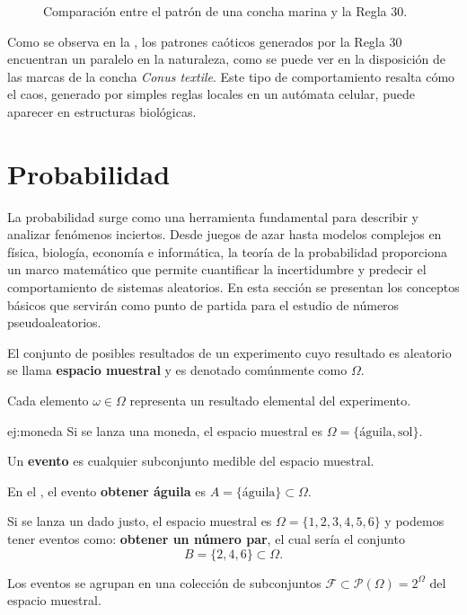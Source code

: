 \documentclass[../Main.tex]{subfiles}
\begin{document}
\begin{figure}[h!]
\hfill
{}
\hfill
{}
\hfill
\caption{Comparación entre el patrón de una concha marina y la Regla 30.}
\label{fig:R30-comp}
\end{figure}

Como se observa en la , los patrones caóticos generados por la Regla 30 encuentran un paralelo en la naturaleza, como se puede ver en la disposición de las marcas de la concha \textit{Conus textile}. Este tipo de comportamiento resalta cómo el caos, generado por simples reglas locales en un autómata celular, puede aparecer en estructuras biológicas.

\section{Probabilidad}
La probabilidad surge como una herramienta fundamental para describir y analizar fenómenos inciertos. Desde juegos de azar hasta modelos complejos en física, biología, economía e informática, la teoría de la probabilidad proporciona un marco matemático que permite cuantificar la incertidumbre y predecir el comportamiento de sistemas aleatorios. En esta sección se presentan los conceptos básicos que servirán como punto de partida para el estudio de números pseudoaleatorios.

\begin{definition}{}{}
El conjunto de posibles resultados de un experimento cuyo resultado es aleatorio se llama \textbf{espacio muestral} y es denotado comúnmente como $\Omega$. 
\end{definition}
Cada elemento $\omega \in \Omega$ representa un resultado elemental del experimento. 
\begin{example}{}{ej:moneda}
    Si se lanza una moneda, el espacio muestral es $\Omega = \{\text{águila}, \text{sol}\}$.
\end{example}
\begin{definition}{}{}
Un \textbf{evento} es cualquier subconjunto medible del espacio muestral.
\end{definition}
En el , el evento \textbf{obtener águila} es $A = \{\text{águila}\}\subset \Omega$. 
\begin{example}{}{}
    Si se lanza un dado justo, el espacio muestral es  $\Omega =\{1,2,3,4,5,6\}$ y podemos tener eventos como: \textbf{obtener un número par}, el cual sería el conjunto $$B=\{2,4,6\}\subset \Omega.$$
\end{example}
Los eventos se agrupan en una colección de subconjuntos $\mathcal{F}\subset \mathcal{P}(\Omega)=2^{\Omega}$ del espacio muestral. 
\end{document}
